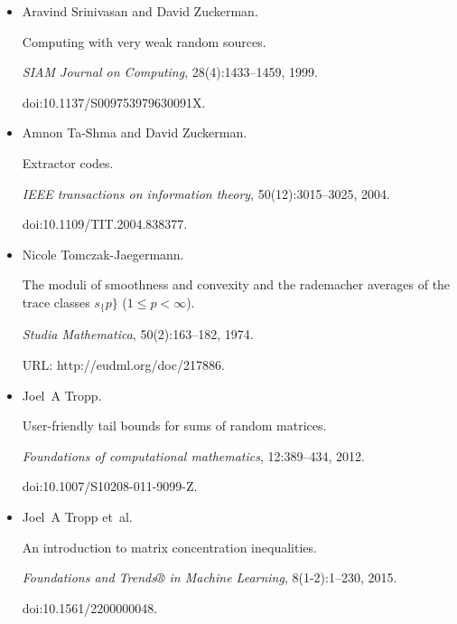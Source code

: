 \documentclass[10pt,a4paper]{article}
\begin{document}
\begin{itemize}
\item[] 
[34]

Aravind Srinivasan and David Zuckerman.


Computing with very weak random sources.


\emph{SIAM Journal on Computing}, 28(4):1433–1459, 1999.


doi:10.1137/S009753979630091X.





\item[] 
[35]

Amnon Ta-Shma and David Zuckerman.


Extractor codes.


\emph{IEEE transactions on information theory}, 50(12):3015–3025,
2004.


doi:10.1109/TIT.2004.838377.





\item[] 
[36]

Nicole Tomczak-Jaegermann.


The moduli of smoothness and convexity and the rademacher averages of
the trace classes $s_{\{}p\}$ ($1\leq p<\infty$).


\emph{Studia Mathematica}, 50(2):163–182, 1974.


URL: http://eudml.org/doc/217886.





\item[] 
[37]

Joel A Tropp.


User-friendly tail bounds for sums of random matrices.


\emph{Foundations of computational mathematics}, 12:389–434, 2012.


doi:10.1007/S10208-011-9099-Z.





\item[] 
[38]

Joel A Tropp et al.


An introduction to matrix concentration inequalities.


\emph{Foundations and Trends® in Machine Learning},
8(1-2):1–230, 2015.


doi:10.1561/2200000048.






\end{itemize}
\end{document}
